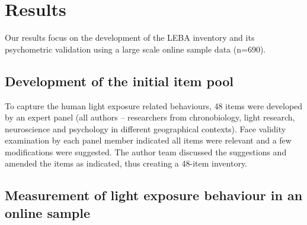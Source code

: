 \documentclass[
  man]{apa6}
\begin{document}
\hypertarget{results}{%
\section{Results}\label{results}}

Our results focus on the development of the LEBA inventory and its psychometric validation using a large scale online sample data (n=690).

\hypertarget{development-of-the-initial-item-pool}{%
\subsection{Development of the initial item pool}\label{development-of-the-initial-item-pool}}

To capture the human light exposure related behaviours, 48 items were developed by an expert panel (all authors -- researchers from chronobiology, light research, neuroscience and psychology in different geographical contexts). Face validity examination by each panel member indicated all items were relevant and a few modifications were suggested. The author team discussed the suggestions and amended the items as indicated, thus creating a 48-item inventory.

\hypertarget{measurement-of-light-exposure-behaviour-in-an-online-sample}{%
\subsection{Measurement of light exposure behaviour in an online sample}\label{measurement-of-light-exposure-behaviour-in-an-online-sample}}
\end{document}
